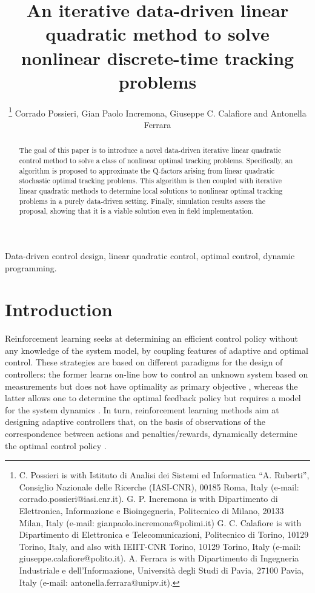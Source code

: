 \documentclass[10pt]{IEEEtran}      %
\title{An iterative data-driven linear quadratic method to solve nonlinear discrete-time tracking problems}
\author{
\thanks{C. Possieri is with Istituto di Analisi dei Sistemi ed Informatica ``A. Ruberti'', Consiglio Nazionale delle Ricerche (IASI-CNR), 00185 Roma, Italy
(e-mail: corrado.possieri@iasi.cnr.it). \newline
\indent G. P. Incremona is with Dipartimento di Elettronica, Informazione e Bioingegneria, Politecnico di Milano, 20133 Milan, Italy
(e-mail: gianpaolo.incremona@polimi.it)\newline
\indent G. C. Calafiore is with Dipartimento di Elettronica e Telecomunicazioni, Politecnico di Torino, 10129 Torino, Italy,
and also with IEIIT-CNR Torino, 10129 Torino, Italy (e-mail: giuseppe.calafiore@polito.it). \newline
\indent A. Ferrara is with Dipartimento di Ingegneria Industriale e dell'Informazione, Universit\`a degli Studi di Pavia, 27100 Pavia, Italy
(e-mail: antonella.ferrara@unipv.it).
}
Corrado Possieri, Gian Paolo Incremona, Giuseppe C. Calafiore and Antonella Ferrara}
\theoremstyle{theorem}
\theoremstyle{remark}
\begin{document}
\maketitle

\begin{abstract}
The goal of this paper is to introduce a novel data-driven iterative linear quadratic control method to solve a class of nonlinear 
optimal tracking problems. 
Specifically, an algorithm is proposed to approximate the Q-factors arising from linear quadratic stochastic optimal tracking problems.
This algorithm is then coupled with iterative linear quadratic methods to determine local solutions to nonlinear optimal tracking problems
in a purely data-driven setting.
Finally, simulation results assess the proposal, showing that it is a viable solution even in field implementation.
\end{abstract}
\begin{IEEEkeywords}
Data-driven control design, linear quadratic control, optimal control, dynamic programming.
\end{IEEEkeywords}

\section{Introduction}
Reinforcement learning seeks at determining an efficient control policy without any knowledge of the system model, 
by coupling features of adaptive \cite{aastrom2013adaptive} and optimal \cite{lewis2012optimal} control.
These strategies are based on different paradigms for the design of controllers: the former learns on-line
how to control an unknown system based on measurements but does not have optimality as primary objective \cite{ioannou2012robust}, 
whereas the latter allows one to determine the optimal feedback policy but requires a model for the system dynamics \cite{liberzon2011calculus}.
In turn, reinforcement learning methods aim at designing adaptive controllers that, on the basis of observations of the correspondence
between actions and penalties/rewards, dynamically determine the optimal control policy \cite{sutton2018reinforcement}.
\end{document}
